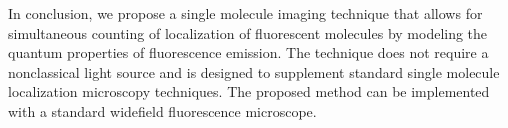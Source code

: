 In conclusion, we propose a single molecule imaging technique that allows for simultaneous counting of localization of fluorescent molecules by modeling the quantum properties of fluorescence emission. The technique does not require a nonclassical light source and is designed to supplement standard single molecule localization microscopy techniques. The proposed method can be implemented with a standard widefield fluorescence microscope.


